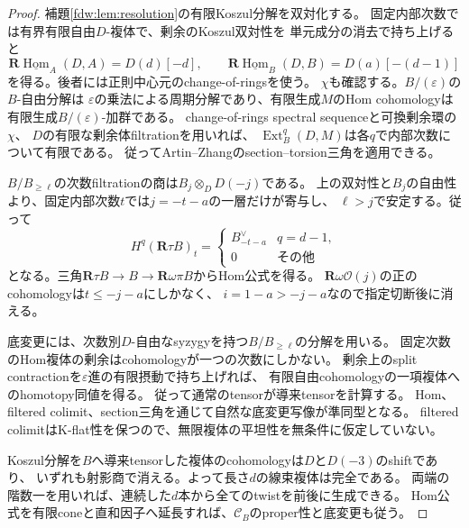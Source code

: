 \begin{proof}
補題\ref{fdw:lem:resolution}の有限Koszul分解を双対化する。
固定内部次数では有界有限自由$D$-複体で、剰余のKoszul双対性を
単元成分の消去で持ち上げると
\[
 \mathbf R\underline{\operatorname{Hom}}_A(D,A)=D(d)[-d],\qquad
 \mathbf R\underline{\operatorname{Hom}}_B(D,B)=D(a)[-(d-1)]
\]
を得る。後者には正則中心元のchange-of-ringsを使う。
$\chi$も確認する。$B/(\varepsilon)$の$B$-自由分解は
$\varepsilon$の乗法による周期分解であり、有限生成$M$のHom cohomologyは
有限生成$B/(\varepsilon)$-加群である。
change-of-rings spectral sequenceと可換剰余環の$\chi$、
$D$の有限な剰余体filtrationを用いれば、
$\operatorname{Ext}_B^q(D,M)$は各$q$で内部次数について有限である。
従ってArtin--Zhangのsection--torsion三角を適用できる\cite{AZ}。

$B/B_{\ge\ell}$の次数filtrationの商は$B_j\otimes_DD(-j)$である。
上の双対性と$B_j$の自由性より、固定内部次数$t$では$j=-t-a$の一層だけが寄与し、
$\ell>j$で安定する。従って
\[
 H^q(\mathbf R\tau B)_t=
 \begin{cases}B_{-t-a}^{\vee}&q=d-1,\\0&\text{その他}\end{cases}
\]
となる。三角$\mathbf R\tau B\to B\to\mathbf R\omega\pi B$からHom公式を得る。
$\mathbf R\omega\mathcal O(j)$の正のcohomologyは$t\le-j-a$にしかなく、
$i=1-a>-j-a$なので指定切断後に消える。

底変更には、次数別$D$-自由なsyzygyを持つ$B/B_{\ge\ell}$の分解を用いる。
固定次数のHom複体の剰余はcohomologyが一つの次数にしかない。
剰余上のsplit contractionを$\varepsilon$進の有限摂動で持ち上げれば、
有限自由cohomologyの一項複体へのhomotopy同値を得る。
従って通常のtensorが導来tensorを計算する。
Hom、filtered colimit、section三角を通じて自然な底変更写像が準同型となる。
filtered colimitはK-flat性を保つので、無限複体の平坦性を無条件に仮定していない。

Koszul分解を$B$へ導来tensorした複体のcohomologyは$D$と$D(-3)$のshiftであり、
いずれも射影商で消える。よって長さ$d$の線束複体は完全である。
両端の階数一を用いれば、連続した$d$本から全てのtwistを前後に生成できる。
Hom公式を有限coneと直和因子へ延長すれば、$\mathcal C_B$のproper性と底変更も従う。
\end{proof}

